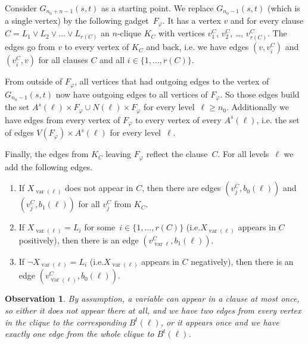 \documentclass[authoryear]{article}
\makeatletter
\newtheorem{observation}[theorem]{Observation}
\theoremstyle{definition}
\DeclareMathOperator{\var}{var}
\renewcommand{\phi}{\varphi}
\newcommand{\0}{\emptyset}
\newcommand{\ie}{i.e.\@\xspace}
\makeatother
\begin{document}
Consider $G_{n_0+n-1}(s,t)$ as a starting point. We replace $G_{n_0-1}(s,t)$
(which is a single vertex) by the following gadget~$F_\phi$. It has a vertex $v$
and for every clause $C=L_1 \lor L_2 \lor{} \ldots {}\lor L_{r(C)}$ an $n$-clique
$K_C$ with vertices $v_1^C$, $v_2^C$, \ldots, $v^C_{r(C)}$. The edges go from
$v$ to every vertex of $K_C$ and back, \ie we have edges $(v,v_i^C)$ and
$(v_i^C,v)$ for all clauses $C$ and all $i\in\{1,\ldots,{r(C)}\}$. 

From outside of $F_\phi$, all vertices that had outgoing edges to the vertex of
$G_{n_0-1}(s,t)$ now have outgoing edges to all vertices of $F_\phi$. So those
edges build the set $A^s(\ell) \times F_\phi \cup N(\ell)\times F_\phi$ for
every level~$\ell\ge n_0$. Additionally we have edges from every vertex of
$F_\phi$ to every vertex of every $A^s(\ell)$, \ie the set of edges
$V(F_\phi)\times A^s(\ell)$ for every level~$\ell$. 

Finally, the edges from $K_C$ leaving $F_\phi$ reflect the
clause~$C$. For all levels~$\ell$ we add the following edges.
\begin{enumerate}
\item If $X_{\var(\ell)}$ does not appear in $C$, then there are edges
  $(v_j^C,b_0(\ell))$ and $(v_j^C,b_1(\ell))$ for all $v_j^C$ from $K_C$. 
\item If $X_{\var(\ell)} = L_i$ for some~$i\in\{1,\ldots,r(C)\}$ (\ie $X_{\var(\ell)}$ appears in $C$
  positively), then there is an edge $(v_{\var{\ell}}^C,b_1(\ell))$.
\item If $\neg X_{\var(\ell)} = L_i$ (\ie $X_{\var(\ell)}$ appears in $C$ negatively), then there is
  an edge $(v_{\var(\ell)}^C,b_0(\ell))$.
\end{enumerate}
\begin{observation}\label{obs:two-or-one}
By assumption, a variable can appear in a clause at most
once, so either it does not appear there at all, and we have two edges
from every vertex in the clique to the corresponding $B^t(\ell)$, or it appears once
and we have exactly one edge from the whole clique to $B^t(\ell)$.
\end{observation}
\end{document}
